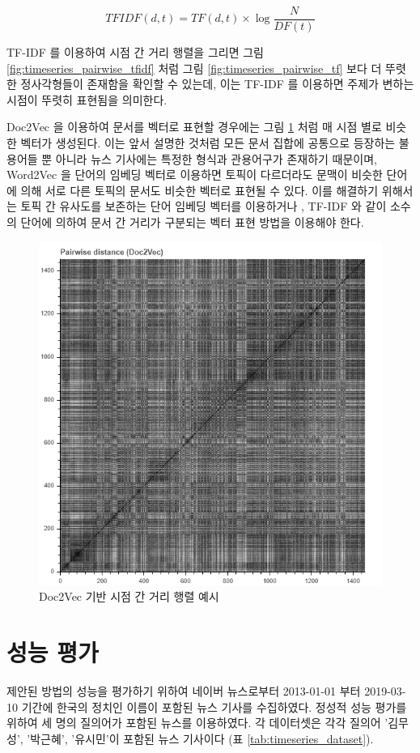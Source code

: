 \documentclass[oneside, ko,phd]{snuthesis_utf8_kor}
\begin{document}
\begin{equation}
TFIDF(d,t) = TF(d,t) \times \log \frac{N}{DF(t)}
\label{eq:tfidf}
\end{equation}

TF-IDF 를 이용하여 시점 간 거리 행렬을 그리면 그림 \ref{fig:timeseries_pairwise_tfidf} 처럼 그림 \ref{fig:timeseries_pairwise_tf} 보다 더 뚜렷한 정사각형들이 존재함을 확인할 수 있는데, 이는 TF-IDF 를 이용하면 주제가 변하는 시점이 뚜렷히 표현됨을 의미한다.

Doc2Vec 을 이용하여 문서를 벡터로 표현할 경우에는 그림 \ref{fig:timeseries_pairwise_doc2vec} 처럼 매 시점 별로 비슷한 벡터가 생성된다.
이는 앞서 설명한 것처럼 모든 문서 집합에 공통으로 등장하는 불용어들 뿐 아니라 뉴스 기사에는 특정한 형식과 관용어구가 존재하기 때문이며, Word2Vec 을 단어의 임베딩 벡터로 이용하면 토픽이 다르더라도 문맥이 비슷한 단어에 의해 서로 다른 토픽의 문서도 비슷한 벡터로 표현될 수 있다.
이를 해결하기 위해서는 토픽 간 유사도를 보존하는 단어 임베딩 벡터를 이용하거나 \cite{moody2016mixing, liu2015topical}, TF-IDF 와 같이 소수의 단어에 의하여 문서 간 거리가 구분되는 벡터 표현 방법을 이용해야 한다.

\begin{figure}[H]
\centering
\includegraphics[keepaspectratio=true, width=0.5\linewidth]{fig/timeseries_pairwise_doc2vec.png}
\caption{Doc2Vec 기반 시점 간 거리 행렬 예시}
\label{fig:timeseries_pairwise_doc2vec}
\end{figure}

\section{성능 평가}

제안된 방법의 성능을 평가하기 위하여 네이버 뉴스로부터 2013-01-01 부터 2019-03-10 기간에 한국의 정치인 이름이 포함된 뉴스 기사를 수집하였다.
정성적 성능 평가를 위하여 세 명의 질의어가 포함된 뉴스를 이용하였다.
각 데이터셋은 각각 질의어 '김무성', '박근혜', '유시민'이 포함된 뉴스 기사이다 (표 \ref{tab:timeseries_dataset}).
\end{document}
